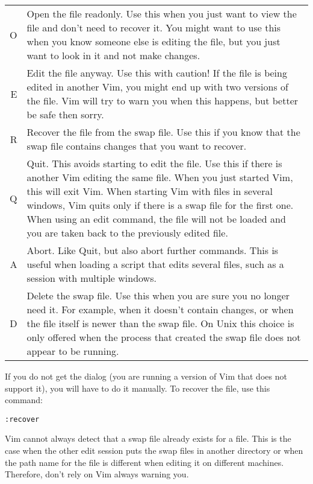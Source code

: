 \begin{center} \begin{tabularx}{\textwidth}{r X}
				O &  Open the file readonly.
				Use this when you just want to view the file and don't need to recover it.
				You might want to use this when you know someone else is editing the file, but you just want to look in it and not make changes. \\

				E & Edit the file anyway.
				Use this with caution!  If the file is being edited in another Vim, you might end up with two versions of the file.
				Vim will try to warn you when this happens, but better be safe then sorry. \\

				R & Recover the file from the swap file.
				Use this if you know that the swap file contains changes that you want to recover. \\

				Q & Quit.
				This avoids starting to edit the file.
				Use this if there is another Vim editing the same file.
				When you just started Vim, this will exit Vim.
				When starting Vim with files in several windows, Vim quits only if there is a swap file for the first one.
				When using an edit command, the file will not be loaded and you are taken back to the previously edited file. \\

				A & Abort.
				Like Quit, but also abort further commands.
				This is useful when loading a script that edits several files, such as a session with multiple windows. \\

				D &  Delete the swap file.
				Use this when you are sure you no longer need it.
				For example, when it doesn't contain changes, or when the file itself is newer than the swap file.
				On Unix this choice is only offered when the process that created the swap file does not appear to be running. \\
\end{tabularx} \end{center}

If you do not get the dialog (you are running a version of Vim that does not support it), you will have to do it manually.
To recover the file, use this command:

\begin{Verbatim}[samepage=true]
 :recover
\end{Verbatim}

Vim cannot always detect that a swap file already exists for a file.
This is the case when the other edit session puts the swap files in another directory or when the path name for the file is different when editing it on different machines.
Therefore, don't rely on Vim always warning you.

